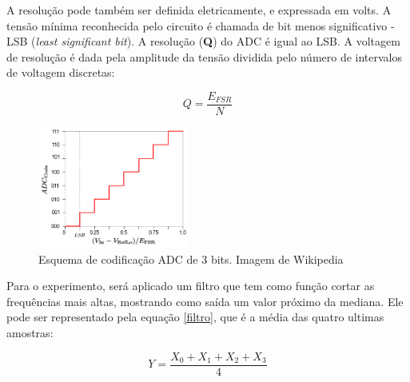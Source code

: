 A resolução pode também ser definida eletricamente, e expressada em volts. A tensão mínima reconhecida pelo circuito é chamada de bit menos significativo - LSB (\textit{least significant bit}). A resolução (\textbf{Q}) do ADC é igual ao LSB. A voltagem de resolução é dada pela amplitude da tensão dividida pelo número de intervalos de voltagem discretas:

\[
	Q = \frac{E_{FSR}}{N}
\]
	
\begin{figure} %
  \centering
  \includegraphics[width=5cm]{./fts/ADC}
  \caption{ Esquema de codificação ADC de 3 bits. Imagem de Wikipedia\cite{wikipedia}}
  \label{caption1}
\end{figure}

Para o experimento, será aplicado um filtro que tem como função cortar as frequências mais altas, mostrando como saída um valor próximo da mediana. Ele pode ser representado pela equação \ref{filtro}, que é a média das quatro ultimas amostras:

\begin{equation}\label{filtro}
	Y=\frac{X_0+X_1+X_2+X_3}{4}
\end{equation}
